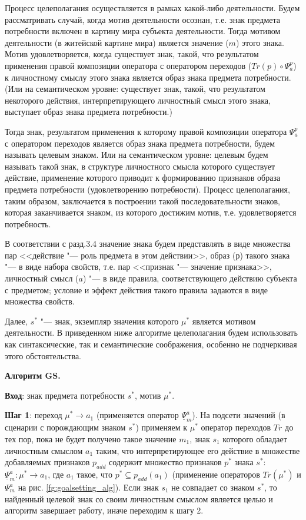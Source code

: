 Процесс целеполагания осуществляется в рамках какой-либо деятельности. Будем рассматривать случай, когда мотив деятельности осознан, т.е. знак предмета потребности включен в картину мира субъекта деятельности. Тогда мотивом деятельности (в житейской картине мира) является значение ($m$) этого знака. Мотив удовлетворяется, когда существует знак, такой, что результатом применения правой композиции оператора   с оператором переходов ($Tr(p)\circ\Psi_a^p$) к личностному смыслу этого знака является образ знака предмета потребности. (Или на семантическом уровне: существует знак, такой, что результатом некоторого действия, интерпретирующего личностный смысл этого знака, выступает образ знака предмета потребности.)

Тогда знак, результатом применения к которому правой композиции оператора $\Psi_a^p$ с оператором переходов является образ знака предмета потребности, будем называть целевым знаком. Или на семантическом уровне: целевым будем называть такой знак, в структуре личностного смысла которого существует действие, применение которого приводит к формированию признаков образа предмета потребности (удовлетворению потребности). Процесс целеполагания, таким образом, заключается в построении такой последовательности знаков, которая заканчивается знаком, из которого достижим мотив, т.е. удовлетворяется потребность.

В соответствии с разд.3.4 значение знака будем представлять в виде множества пар <<действие "--- роль предмета в этом действии>>, образ ($р$) такого знака "--- в виде набора свойств, т.е. пар <<признак "--- значение признака>>, личностный смысл ($a$) "--- в виде правила, соответствующего действию субъекта с предметом; условие и эффект действия такого правила задаются в виде множества свойств.

Далее, $s^*$ "--- знак, экземпляр значения которого $\mu^*$ является мотивом деятельности. В приведенном ниже алгоритме целеполагания будем использовать как синтаксические, так и семантические соображения, особенно не подчеркивая этого обстоятельства.

\textbf{Алгоритм GS.}

\textbf{Вход}: знак предмета потребности $s^*$, мотив $\mu^*$.

\textbf{Шаг 1}: переход $\mu^*\rightarrow a_1$ (применяется оператор $\underline{\Psi}_m^a$). На подсети значений (в сценарии с порождающим знаком $s^*$) применяем к $\mu^*$ оператор переходов $Tr$ до тех пор, пока не будет получено такое значение $m_1$, знак $s_1$ которого обладает личностным смыслом $a_1$ таким, что интерпретирующее его действие в множестве добавляемых признаков $p_{add}$ содержит множество признаков $p^*$ знака $s^*$:  $\underline{\Psi}_m^a:\mu^*\rightarrow a_1$, где $a_1$ такое, что $p^*\subseteq p_{add}(a_1)$ (применение операторов $Tr(\mu^*)$ и $\Psi_m^a$ на рис. \ref{fg:goalsetting_alg}). Если знак $s_1$ не совпадает со знаком $s^*$, то найденный целевой знак со своим личностным смыслом является целью и алгоритм завершает работу, иначе переходим к шагу 2.

